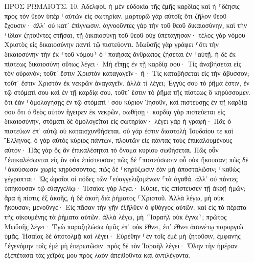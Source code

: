 \documentclass[twoside, 9pt]{extreport}
\begin{document}
ΠΡΟΣ ΡΩΜΑΙΟΥΣ.
10.
Ἀδελφοί, ἡ μὲν εὐδοκία τῆς ἐμῆς καρδίας καὶ ἡ ⸀δέησις πρὸς τὸν θεὸν ὑπὲρ ⸀αὐτῶν εἰς σωτηρίαν. 
μαρτυρῶ γὰρ αὐτοῖς ὅτι ζῆλον θεοῦ ἔχουσιν· ἀλλ᾽ οὐ κατ᾽ ἐπίγνωσιν, 
ἀγνοοῦντες γὰρ τὴν τοῦ θεοῦ δικαιοσύνην, καὶ τὴν ⸀ἰδίαν ζητοῦντες στῆσαι, τῇ δικαιοσύνῃ τοῦ θεοῦ οὐχ ὑπετάγησαν· 
τέλος γὰρ νόμου Χριστὸς εἰς δικαιοσύνην παντὶ τῷ πιστεύοντι. 
Μωϋσῆς γὰρ γράφει ⸂ὅτι τὴν δικαιοσύνην τὴν ἐκ ⸀τοῦ νόμου⸃ ὁ ⸀ποιήσας ἄνθρωπος ζήσεται ἐν ⸀αὐτῇ. 
ἡ δὲ ἐκ πίστεως δικαιοσύνη οὕτως λέγει· Μὴ εἴπῃς ἐν τῇ καρδίᾳ σου· Τίς ἀναβήσεται εἰς τὸν οὐρανόν; τοῦτ᾽ ἔστιν Χριστὸν καταγαγεῖν· 
ἤ· Τίς καταβήσεται εἰς τὴν ἄβυσσον; τοῦτ᾽ ἔστιν Χριστὸν ἐκ νεκρῶν ἀναγαγεῖν. 
ἀλλὰ τί λέγει; Ἐγγύς σου τὸ ῥῆμά ἐστιν, ἐν τῷ στόματί σου καὶ ἐν τῇ καρδίᾳ σου, τοῦτ᾽ ἔστιν τὸ ῥῆμα τῆς πίστεως ὃ κηρύσσομεν. 
ὅτι ἐὰν ⸀ὁμολογήσῃς ἐν τῷ στόματί ⸀σου κύριον Ἰησοῦν, καὶ πιστεύσῃς ἐν τῇ καρδίᾳ σου ὅτι ὁ θεὸς αὐτὸν ἤγειρεν ἐκ νεκρῶν, σωθήσῃ· 
καρδίᾳ γὰρ πιστεύεται εἰς δικαιοσύνην, στόματι δὲ ὁμολογεῖται εἰς σωτηρίαν· 
λέγει γὰρ ἡ γραφή· Πᾶς ὁ πιστεύων ἐπ᾽ αὐτῷ οὐ καταισχυνθήσεται. 
οὐ γάρ ἐστιν διαστολὴ Ἰουδαίου τε καὶ Ἕλληνος, ὁ γὰρ αὐτὸς κύριος πάντων, πλουτῶν εἰς πάντας τοὺς ἐπικαλουμένους αὐτόν· 
Πᾶς γὰρ ὃς ἂν ἐπικαλέσηται τὸ ὄνομα κυρίου σωθήσεται. 
Πῶς οὖν ⸀ἐπικαλέσωνται εἰς ὃν οὐκ ἐπίστευσαν; πῶς δὲ ⸀πιστεύσωσιν οὗ οὐκ ἤκουσαν; πῶς δὲ ⸀ἀκούσωσιν χωρὶς κηρύσσοντος; 
πῶς δὲ ⸀κηρύξωσιν ἐὰν μὴ ἀποσταλῶσιν; ⸀καθὼς γέγραπται· Ὡς ὡραῖοι οἱ πόδες τῶν ⸀εὐαγγελιζομένων ⸀τὰ ἀγαθά. 
ἀλλ᾽ οὐ πάντες ὑπήκουσαν τῷ εὐαγγελίῳ· Ἠσαΐας γὰρ λέγει· Κύριε, τίς ἐπίστευσεν τῇ ἀκοῇ ἡμῶν; 
ἄρα ἡ πίστις ἐξ ἀκοῆς, ἡ δὲ ἀκοὴ διὰ ῥήματος ⸀Χριστοῦ. 
Ἀλλὰ λέγω, μὴ οὐκ ἤκουσαν; μενοῦνγε· Εἰς πᾶσαν τὴν γῆν ἐξῆλθεν ὁ φθόγγος αὐτῶν, καὶ εἰς τὰ πέρατα τῆς οἰκουμένης τὰ ῥήματα αὐτῶν. 
ἀλλὰ λέγω, μὴ ⸂Ἰσραὴλ οὐκ ἔγνω⸃; πρῶτος Μωϋσῆς λέγει· Ἐγὼ παραζηλώσω ὑμᾶς ἐπ᾽ οὐκ ἔθνει, ἐπ᾽ ἔθνει ἀσυνέτῳ παροργιῶ ὑμᾶς. 
Ἠσαΐας δὲ ἀποτολμᾷ καὶ λέγει· Εὑρέθην ⸀ἐν τοῖς ἐμὲ μὴ ζητοῦσιν, ἐμφανὴς ⸀ἐγενόμην τοῖς ἐμὲ μὴ ἐπερωτῶσιν. 
πρὸς δὲ τὸν Ἰσραὴλ λέγει· Ὅλην τὴν ἡμέραν ἐξεπέτασα τὰς χεῖράς μου πρὸς λαὸν ἀπειθοῦντα καὶ ἀντιλέγοντα. 
\end{document}
